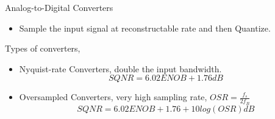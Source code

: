 \documentclass{beamer}
\begin{document}
\begin{frame}{Analog-to-Digital Converters}
	\begin{itemize}
		\item Sample the input signal at reconstructable rate and then Quantize.
		\pause
	\end{itemize}
	Types of converters,
	\pause
	\begin{itemize}
	\pause
		\item Nyquist-rate Converters, double the input bandwidth.
		\begin{equation*}
			SQNR = 6.02ENOB + 1.76 dB
		\end{equation*}
		\pause
		\item Oversampled Converters, very high sampling rate, $OSR = \frac{f_s}{2f_B}$
		\begin{equation*}
			SQNR = 6.02ENOB + 1.76 + 10log(OSR)dB
		\end{equation*}
	\end{itemize}
\end{frame}
\end{document}
